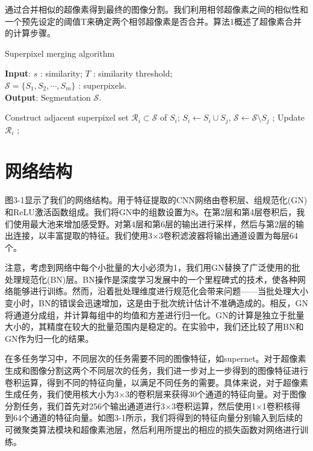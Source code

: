 通过合并相似的超像素得到最终的图像分割。我们利用相邻超像素之间的相似性和一个预先设定的阈值T来确定两个相邻超像素是否合并。算法1概述了超像素合并的计算步骤。
\begin{algorithm}[h]
  \caption{Superpixel merging algorithm}
  \textbf{Input}: $s$ : similarity;
  \hspace*{2em} $T$ : similarity threshold;\\
  \hspace*{2.5em} $\mathcal{S}=\{S_{1}, S_{2},\cdots, S_{m}\}$ : superpixels.\\
  \textbf{Output}: Segmentation $\mathcal{S}$.
  \begin{algorithmic}[1]
    \State Construct adjacent superpixel set $\mathcal{R}_{i}\subset \mathcal{S}$ of $S_i$;
                \State$S_{i} \gets S_{i}\cup S_{j}$, $\mathcal{S} \gets \mathcal{S} \setminus S_{j}$ ;
                \State Update $\mathcal{R}_i$ ;
            \EndIf
        \EndFor
    \EndFor
    \label{algorithm1}
  \end{algorithmic}
\end{algorithm}

\section{网络结构}

图3-1显示了我们的网络结构。用于特征提取的CNN网络由卷积层、组规范化(GN)和ReLU激活函数组成。我们将GN中的组数设置为8。在第2层和第4层卷积后，我们使用最大池来增加感受野。对第4层和第6层的输出进行采样，然后与第2层的输出连接，以丰富提取的特征。我们使用3$\times $3卷积滤波器将输出通道设置为每层64个。

注意，考虑到网络中每个小批量的大小必须为1，我们用GN替换了广泛使用的批处理规范化(BN)层。BN操作是深度学习发展中的一个里程碑式的技术，使各种网络能够进行训练。然而，沿着批处理维度进行规范化会带来问题——当批处理大小变小时，BN的错误会迅速增加，这是由于批次统计估计不准确造成的。相反，GN将通道分成组，并计算每组中的均值和方差进行归一化。GN的计算是独立于批量大小的，其精度在较大的批量范围内是稳定的。在实验中，我们还比较了用BN和GN作为归一化的结果。

在多任务学习中，不同层次的任务需要不同的图像特征，如supernet。对于超像素生成和图像分割这两个不同层次的任务，我们进一步对上一步得到的图像特征进行卷积运算，得到不同的特征向量，以满足不同任务的需要。具体来说，对于超像素生成任务，我们使用核大小为3$\times $3的卷积层来获得30个通道的特征向量。对于图像分割任务，我们首先对256个输出通道进行3$\times $3卷积运算，然后使用1$\times $1卷积核得到64个通道的特征向量。如图3-1所示，我们将得到的特征向量分别输入到后续的可微聚类算法模块和超像素池层，然后利用所提出的相应的损失函数对网络进行训练。

